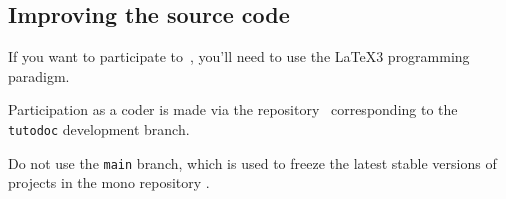\documentclass{tutodoc}
\begin{document}

\subsection{Improving the source code}

\begin{tdocimp}
    If you want to participate to \thisproj\,, you'll need to use the \LaTeX3 programming paradigm.
\end{tdocimp}


Participation as a coder is made via the repository \thisrepo\ corresponding to the \verb#tutodoc# development branch.


\begin{tdoccaut}
Do not use the \verb#main# branch, which is used to freeze the latest stable versions of projects in the mono repository \thismonorepo.
\end{tdoccaut}
\end{document}
